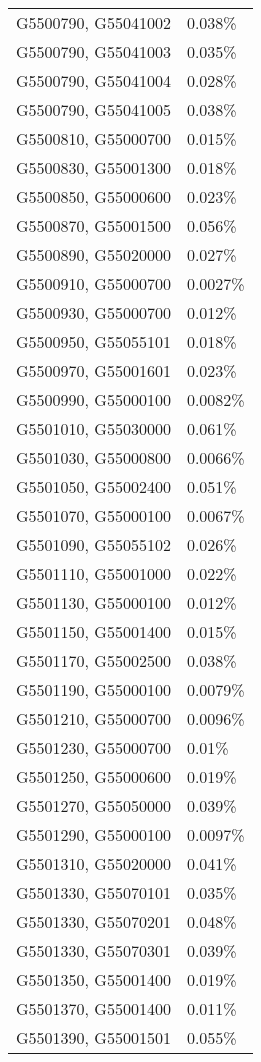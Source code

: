 \begin{longtable}[]{@{}ll@{}}
G5500790, G55041002 & 0.038\% \\
G5500790, G55041003 & 0.035\% \\
G5500790, G55041004 & 0.028\% \\
G5500790, G55041005 & 0.038\% \\
G5500810, G55000700 & 0.015\% \\
G5500830, G55001300 & 0.018\% \\
G5500850, G55000600 & 0.023\% \\
G5500870, G55001500 & 0.056\% \\
G5500890, G55020000 & 0.027\% \\
G5500910, G55000700 & 0.0027\% \\
G5500930, G55000700 & 0.012\% \\
G5500950, G55055101 & 0.018\% \\
G5500970, G55001601 & 0.023\% \\
G5500990, G55000100 & 0.0082\% \\
G5501010, G55030000 & 0.061\% \\
G5501030, G55000800 & 0.0066\% \\
G5501050, G55002400 & 0.051\% \\
G5501070, G55000100 & 0.0067\% \\
G5501090, G55055102 & 0.026\% \\
G5501110, G55001000 & 0.022\% \\
G5501130, G55000100 & 0.012\% \\
G5501150, G55001400 & 0.015\% \\
G5501170, G55002500 & 0.038\% \\
G5501190, G55000100 & 0.0079\% \\
G5501210, G55000700 & 0.0096\% \\
G5501230, G55000700 & 0.01\% \\
G5501250, G55000600 & 0.019\% \\
G5501270, G55050000 & 0.039\% \\
G5501290, G55000100 & 0.0097\% \\
G5501310, G55020000 & 0.041\% \\
G5501330, G55070101 & 0.035\% \\
G5501330, G55070201 & 0.048\% \\
G5501330, G55070301 & 0.039\% \\
G5501350, G55001400 & 0.019\% \\
G5501370, G55001400 & 0.011\% \\
G5501390, G55001501 & 0.055\% \\

\end{longtable}
